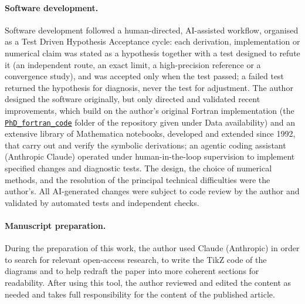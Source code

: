 \documentclass[11pt,a4paper]{article}
\begin{document}
\paragraph{Software development.} Software development followed a human-directed, AI-assisted
workflow, organised as a Test Driven Hypothesis Acceptance cycle: each derivation, implementation or
numerical claim was stated as a hypothesis together with a test designed to refute it (an independent
route, an exact limit, a high-precision reference or a convergence study), and was accepted only when
the test passed; a failed test returned the hypothesis for diagnosis, never the test for adjustment. The author designed the software originally, but only directed and validated recent
improvements, which build on the author's original Fortran implementation (the
\href{https://github.com/tmnestor/MultipleScatteringCalculations/tree/main/PhD_fortran_code}{\texttt{PhD\_fortran\_code}}
folder of the repository given under Data availability) and an extensive library of Mathematica notebooks,
developed and extended since 1992, that carry out and verify the symbolic derivations; an agentic coding
assistant (Anthropic Claude) operated under human-in-the-loop supervision to implement specified changes and
diagnostic tests. The design, the choice of numerical methods, and the resolution of the principal
technical difficulties were the author's. All AI-generated changes were subject to code review by the
author and validated by automated tests and independent checks.

\paragraph{Manuscript preparation.} During the preparation of this work, the author used Claude
(Anthropic) in order to search for relevant open-access research, to write the TikZ code of the diagrams
and to help redraft the paper into more coherent sections for readability. After using this tool, the
author reviewed and edited the content as needed and takes full responsibility for the content of the
published article.



\end{document}
